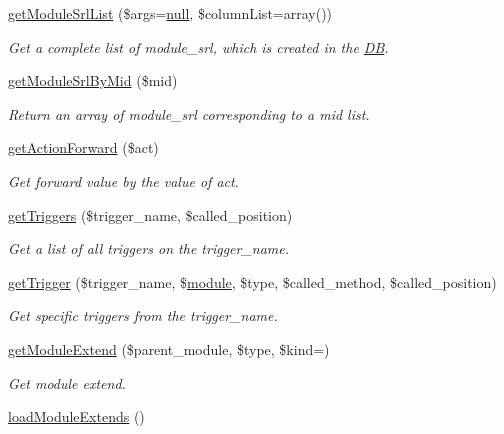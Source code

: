 \begin{DoxyCompactItemize}
\hyperlink{classmoduleModel_ae63e7e551002fac4c01a330a76dd7244}{get\+Module\+Srl\+List} (\$args=\hyperlink{modernizr_8min_8js_a286f9ec831c5e676eeb493248eab9575}{null}, \$column\+List=array())
\begin{DoxyCompactList}\small\item\em Get a complete list of module\+\_\+srl, which is created in the \hyperlink{classDB}{DB}. \end{DoxyCompactList}\item 
\hyperlink{classmoduleModel_a857a241844d60b7678bd144175d23f29}{get\+Module\+Srl\+By\+Mid} (\$mid)
\begin{DoxyCompactList}\small\item\em Return an array of module\+\_\+srl corresponding to a mid list. \end{DoxyCompactList}\item 
\hyperlink{classmoduleModel_a2a06b59fa663c1e79f81aac571e2e5c8}{get\+Action\+Forward} (\$act)
\begin{DoxyCompactList}\small\item\em Get forward value by the value of act. \end{DoxyCompactList}\item 
\hyperlink{classmoduleModel_a979238a3b59bf52ccaa29ec3f7744808}{get\+Triggers} (\$trigger\+\_\+name, \$called\+\_\+position)
\begin{DoxyCompactList}\small\item\em Get a list of all triggers on the trigger\+\_\+name. \end{DoxyCompactList}\item 
\hyperlink{classmoduleModel_ae570716b47c7fd19b7fc0d217a155b22}{get\+Trigger} (\$trigger\+\_\+name, \$\hyperlink{classmodule}{module}, \$type, \$called\+\_\+method, \$called\+\_\+position)
\begin{DoxyCompactList}\small\item\em Get specific triggers from the trigger\+\_\+name. \end{DoxyCompactList}\item 
\hyperlink{classmoduleModel_a1dd3c03b874a4f6e05f6b5e8ec283665}{get\+Module\+Extend} (\$parent\+\_\+module, \$type, \$kind=\textquotesingle{}\textquotesingle{})
\begin{DoxyCompactList}\small\item\em Get module extend. \end{DoxyCompactList}\item 
\hyperlink{classmoduleModel_adfde81ebf0fcb2814ba49ad23ce803ff}{load\+Module\+Extends} ()

\end{DoxyCompactItemize}
